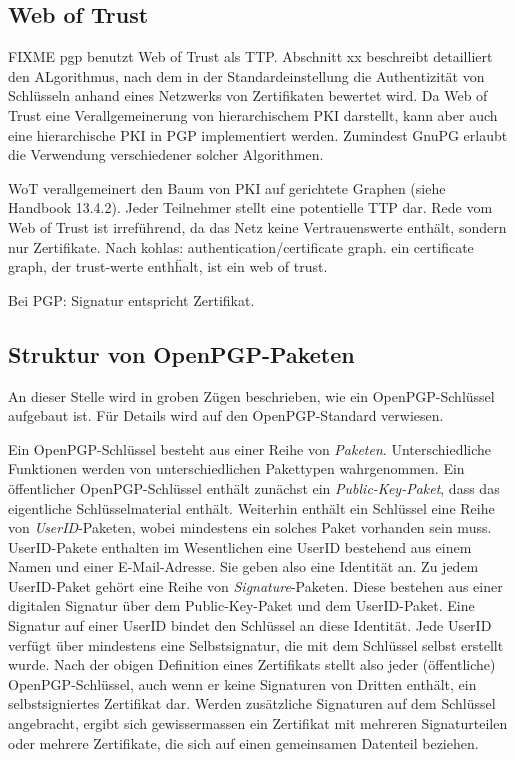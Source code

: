\subsection{Web of Trust}
\label{ch:Grundlagen:sec:PublicKeyCrypto:subsec:KeyAuth:subsubsec:WOT}

FIXME 
pgp benutzt Web of Trust als TTP. Abschnitt xx beschreibt detailliert
den ALgorithmus, nach dem in der Standardeinstellung die
Authentizit\"at von Schl\"usseln anhand eines Netzwerks von
Zertifikaten bewertet wird. Da Web of Trust eine Verallgemeinerung von
hierarchischem PKI darstellt, kann aber auch eine hierarchische PKI in
PGP implementiert werden. Zumindest GnuPG erlaubt die Verwendung
verschiedener solcher Algorithmen.

WoT verallgemeinert den Baum von PKI auf gerichtete Graphen (siehe
Handbook 13.4.2). Jeder Teilnehmer stellt eine potentielle TTP dar.
Rede vom Web of Trust ist irref\"uhrend, da das Netz keine
Vertrauenswerte enth\"alt, sondern nur Zertifikate.
Nach kohlas: authentication/certificate graph. ein certificate graph,
der trust-werte enth\"halt, ist ein web of trust.

Bei PGP: Signatur entspricht Zertifikat.


\subsection{Struktur von OpenPGP-Paketen}
\label{sec:structure-openpgp}
An dieser Stelle wird in groben Z\"ugen beschrieben, wie ein
OpenPGP-Schl\"ussel aufgebaut ist. F\"ur Details wird auf den
OpenPGP-Standard\cite{Callas2007} verwiesen.

Ein OpenPGP-Schl\"ussel besteht aus einer Reihe von
\emph{Paketen}. Unterschiedliche Funktionen werden von
unterschiedlichen Pakettypen wahrgenommen. Ein \"offentlicher
OpenPGP-Schl\"ussel enth\"alt zun\"achst ein \emph{Public-Key-Paket},
dass das eigentliche Schl\"usselmaterial enth\"alt. Weiterhin
enth\"alt ein Schl\"ussel eine Reihe von \emph{UserID}-Paketen, wobei
mindestens ein solches Paket vorhanden sein muss. UserID-Pakete
enthalten im Wesentlichen eine UserID bestehend aus einem Namen und
einer E-Mail-Adresse. Sie geben also eine Identit\"at an. Zu jedem
UserID-Paket geh\"ort eine Reihe von \emph{Signature}-Paketen. Diese
bestehen aus einer digitalen Signatur \"uber dem Public-Key-Paket und
dem UserID-Paket. Eine Signatur auf einer UserID bindet den
Schl\"ussel an diese Identit\"at. Jede UserID verf\"ugt \"uber
mindestens eine Selbstsignatur, die mit dem Schl\"ussel selbst
erstellt wurde. Nach der obigen Definition eines Zertifikats stellt
also jeder (\"offentliche) OpenPGP-Schl\"ussel, auch wenn er keine
Signaturen von Dritten enth\"alt, ein selbstsigniertes Zertifikat
dar. Werden zus\"atzliche Signaturen auf dem Schl\"ussel angebracht,
ergibt sich gewissermassen ein Zertifikat mit mehreren Signaturteilen
oder mehrere Zertifikate, die sich auf einen gemeinsamen Datenteil
beziehen.

